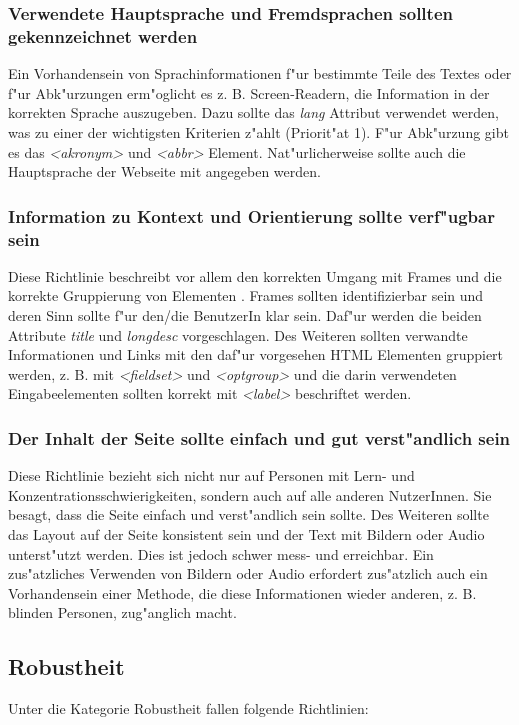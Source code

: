 \documentclass[a4paper,bibtotoc,oneside]{scrbook}
\begin{document}
\subsubsection{Verwendete Hauptsprache und Fremdsprachen sollten gekennzeichnet werden}
Ein Vorhandensein von Sprachinformationen f"ur bestimmte Teile des Textes oder f"ur Abk"urzungen erm"oglicht es z. B. Screen-Readern, die Information in der korrekten Sprache auszugeben. Dazu sollte das \emph{lang} Attribut verwendet werden, was zu einer der wichtigsten Kriterien z"ahlt (Priorit"at 1). F"ur Abk"urzung gibt es das \emph{<akronym>} und \emph{<abbr>} Element.
Nat"urlicherweise sollte auch die Hauptsprache der Webseite mit angegeben werden.\cite[Abschnitt 6.4]{wcag1}

\subsubsection{Information zu Kontext und Orientierung sollte verf"ugbar sein}
Diese Richtlinie beschreibt vor allem den korrekten Umgang mit Frames und die korrekte Gruppierung von Elementen \cite[S. 50]{barr_webd}. Frames sollten identifizierbar sein und deren Sinn sollte f"ur den/die BenutzerIn klar sein. Daf"ur werden die beiden Attribute \emph{title} und \emph{longdesc} vorgeschlagen. Des Weiteren sollten verwandte Informationen und Links mit den daf"ur vorgesehen HTML Elementen gruppiert werden, z. B. mit \emph{<fieldset>} und \emph{<optgroup>} und die darin verwendeten Eingabeelementen sollten korrekt mit \emph{<label>} beschriftet werden. 
\cite[Abschnitt 6.12]{wcag1}

\subsubsection{Der Inhalt der Seite sollte einfach und gut verst"andlich sein}
Diese Richtlinie bezieht sich nicht nur auf Personen mit Lern- und Konzentrationsschwierigkeiten, sondern auch auf alle anderen NutzerInnen. Sie besagt, dass die Seite einfach und verst"andlich sein sollte. Des Weiteren sollte das Layout auf der Seite konsistent sein und der Text mit Bildern oder Audio unterst"utzt werden. \cite[Abschnitt 6.14]{wcag1}
Dies ist jedoch schwer mess- und erreichbar. Ein zus"atzliches Verwenden von Bildern oder Audio erfordert zus"atzlich auch ein Vorhandensein einer Methode, die diese Informationen wieder anderen, z. B. blinden Personen, zug"anglich macht. \cite[S. 52]{barr_webd}

\subsection{Robustheit}
Unter die Kategorie Robustheit fallen folgende Richtlinien: 
\end{document}
